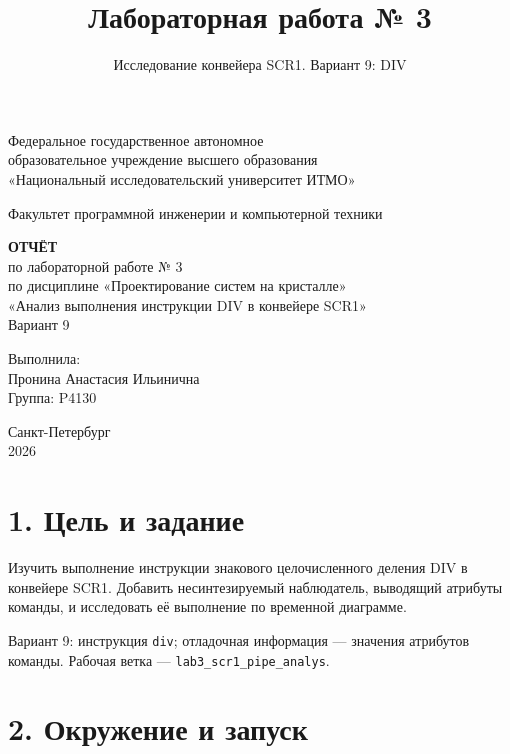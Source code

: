 \documentclass[
  russian,
]{article}
\title{Лабораторная работа № 3}
\subtitle{Исследование конвейера SCR1. Вариант 9: DIV}
\author{}
\date{}
\begin{document}
\begin{titlepage}
\thispagestyle{empty}
\begingroup
{}
\fontsize{14}{25}\selectfont
\begin{center}
Федеральное государственное автономное\\
образовательное учреждение высшего образования\\
«Национальный исследовательский университет ИТМО»

\vspace{10mm}
Факультет программной инженерии и компьютерной техники

\vspace{34mm}
\textbf{ОТЧЁТ}\\
по лабораторной работе № 3\\
по дисциплине «Проектирование систем на кристалле»\\
«Анализ выполнения инструкции DIV в конвейере SCR1»\\
Вариант 9
\end{center}

\vspace{43mm}
\begin{flushright}
Выполнила:\\
Пронина Анастасия Ильинична\\
Группа: P4130
\end{flushright}

\vfill
\begin{center}
Санкт-Петербург\\
2026
\end{center}
\endgroup
\end{titlepage}
\restoregeometry
\setcounter{page}{2}

\section{1. Цель и
задание}\label{ux446ux435ux43bux44c-ux438-ux437ux430ux434ux430ux43dux438ux435}

Изучить выполнение инструкции знакового целочисленного деления DIV в
конвейере SCR1. Добавить несинтезируемый наблюдатель, выводящий атрибуты
команды, и исследовать её выполнение по временной диаграмме.

Вариант 9: инструкция \texttt{div}; отладочная информация --- значения
атрибутов команды. Рабочая ветка --- \texttt{lab3\_scr1\_pipe\_analys}.

\section{2. Окружение и
запуск}\label{ux43eux43aux440ux443ux436ux435ux43dux438ux435-ux438-ux437ux430ux43fux443ux441ux43a}
\end{document}
